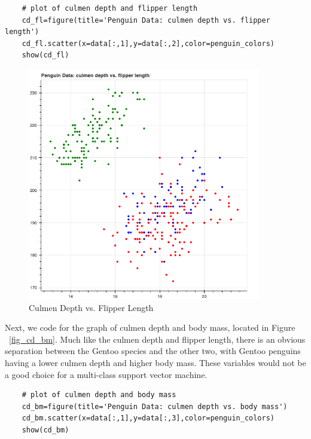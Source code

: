 \documentclass[12pt]{article}
\begin{document}
\begin{verbatim}
    # plot of culmen depth and flipper length
    cd_fl=figure(title='Penguin Data: culmen depth vs. flipper length')
    cd_fl.scatter(x=data[:,1],y=data[:,2],color=penguin_colors)
    show(cd_fl)
\end{verbatim}

\begin{figure}[H]
    \centering
    \includegraphics[width=4in]{Figures/penguins/cd_fl.png}
    \caption{Culmen Depth vs. Flipper Length}
    \label{fig_cd_fl}
\end{figure}

Next, we code for the graph of culmen depth and body mass, located in Figure ~\ref{fig_cd_bm}. Much like the culmen depth and flipper length, there is an obvious separation between the Gentoo species and the other two, with Gentoo penguins having a lower culmen depth and higher body mass. These variables would not be a good choice for a multi-class support vector machine.

\begin{verbatim}
    # plot of culmen depth and body mass
    cd_bm=figure(title='Penguin Data: culmen depth vs. body mass')
    cd_bm.scatter(x=data[:,1],y=data[:,3],color=penguin_colors)
    show(cd_bm)
\end{verbatim}
\end{document}
